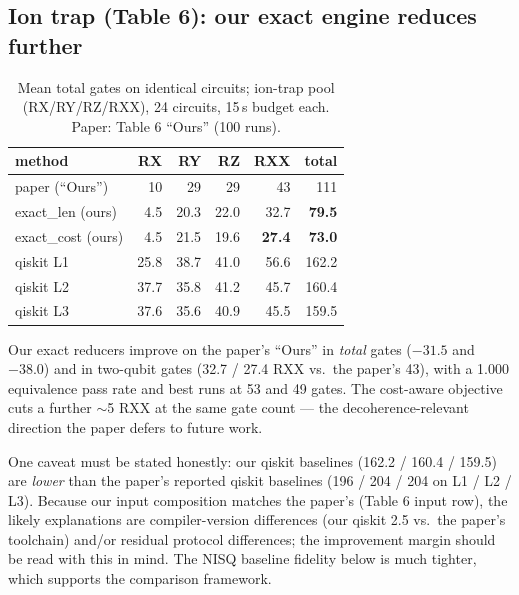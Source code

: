 \documentclass[11pt,a4paper]{article}
\begin{document}
\subsection{Ion trap (Table 6): our exact engine reduces further}
\begin{table}[H]
\centering
\caption{Mean total gates on identical circuits; ion-trap pool (RX/RY/RZ/RXX), 24 circuits, 15\,s budget each. Paper: Table 6 ``Ours'' (100 runs).}
\label{tab:ion}
\begin{tabular}{lrrrrr}
\toprule
method & RX & RY & RZ & RXX & total \\
\midrule
paper (``Ours'')   & 10  & 29  & 29  & 43 & 111 \\
exact\_len (ours)  & 4.5 & 20.3 & 22.0 & 32.7 & \textbf{79.5} \\
exact\_cost (ours) & 4.5 & 21.5 & 19.6 & \textbf{27.4} & \textbf{73.0} \\
qiskit L1 & 25.8 & 38.7 & 41.0 & 56.6 & 162.2 \\
qiskit L2 & 37.7 & 35.8 & 41.2 & 45.7 & 160.4 \\
qiskit L3 & 37.6 & 35.6 & 40.9 & 45.5 & 159.5 \\
\bottomrule
\end{tabular}
\end{table}

Our exact reducers improve on the paper's ``Ours'' in \emph{total} gates
($-31.5$ and $-38.0$) and in two-qubit gates (32.7 / 27.4 RXX vs.\ the paper's
43), with a 1.000 equivalence pass rate and best runs at 53 and 49 gates. The
cost-aware objective cuts a further $\sim$5 RXX at the same gate count --- the
decoherence-relevant direction the paper defers to future work.

One caveat must be stated honestly: our qiskit baselines (162.2 / 160.4 /
159.5) are \emph{lower} than the paper's reported qiskit baselines (196 / 204 /
204 on L1 / L2 / L3). Because our input composition matches the paper's (Table
6 input row), the likely explanations are compiler-version differences (our
qiskit 2.5 vs.\ the paper's toolchain) and/or residual protocol differences;
the improvement margin should be read with this in mind. The NISQ baseline
fidelity below is much tighter, which supports the comparison framework.
\end{document}
